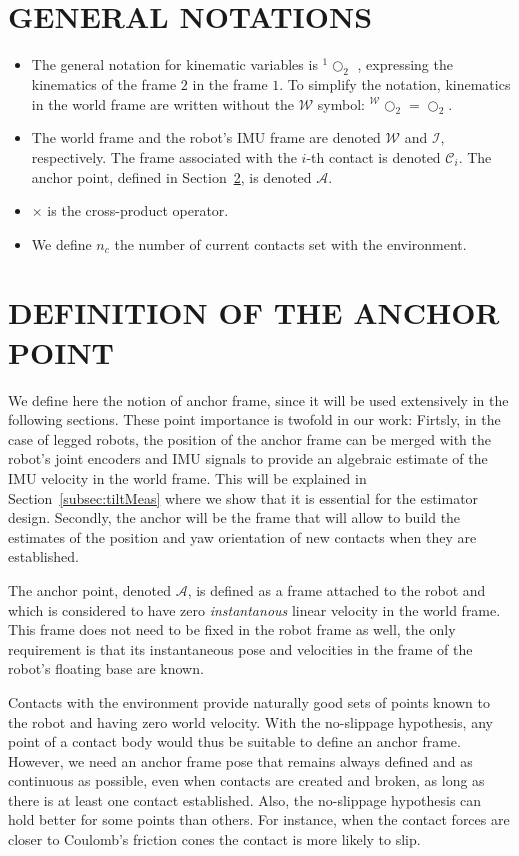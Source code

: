 \documentclass{IJCAS}
\begin{document}
\section{GENERAL NOTATIONS}
\begin{itemize}
    \item The general notation for kinematic variables is $^{1}\bigcirc_{2}$ , expressing the kinematics of the frame $2$ in the frame $1$. To simplify the notation, kinematics in the world frame are written without the $\mathcal{W}$ symbol: $^{\mathcal{W}}\bigcirc_{2}=\bigcirc_{2}$.
    \item The world frame and the robot's IMU frame are denoted $\mathcal{W}$ and $\mathcal{I}$, respectively. The frame associated with the $i$-th contact is denoted $\mathcal{C}_{i}$. The anchor point, defined in Section~\ref{sec:anchor_point}, is denoted $\mathcal{A}$. 
    \item $\times$ is the cross-product operator. 
    \item We define $n_c$ the number of current contacts set with the environment.
    
\end{itemize} 



\section{DEFINITION OF THE ANCHOR POINT}\label{sec:anchor_point}
We define here the notion of anchor frame, since it will be used extensively in the following sections. These point importance is twofold in our work: Firtsly, in the case of legged robots, the position of the anchor frame can be merged with the robot's joint encoders and IMU signals to provide an algebraic estimate of the IMU velocity in the world frame. This will be explained in Section~\ref{subsec:tiltMeas} where we show that it is essential for the estimator design. Secondly, the anchor will be the frame that will allow to build the estimates of the position and yaw orientation of new contacts when they are established.

The anchor point, denoted $\mathcal{A}$, is defined as a frame attached to the robot and which is considered to have zero \emph{instantanous} linear velocity in the world frame. This frame does not need to be fixed in the robot frame as well, the only requirement is that its instantaneous pose and velocities in the frame of the robot's floating base are known. 

Contacts with the environment provide naturally good sets of points known to the robot and having zero world velocity. With the no-slippage hypothesis, any point of a contact body would thus be suitable to define an anchor frame. However, we need an anchor frame pose that remains always defined and as continuous as possible, even when contacts are created and broken, as long as there is at least one contact established. Also, the no-slippage hypothesis can hold better for some points than others. For instance, when the contact forces are closer to Coulomb's friction cones the contact is more likely to slip.
\end{document}
